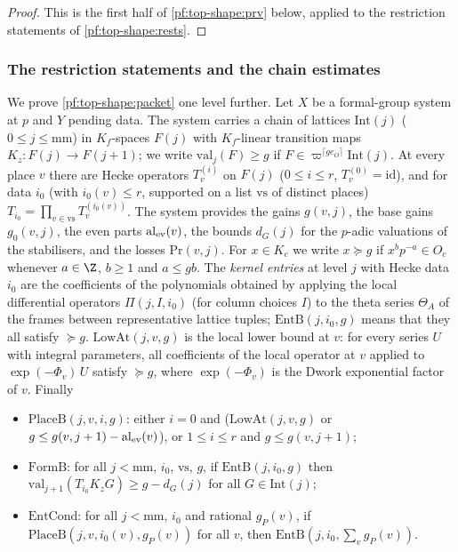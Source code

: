 \begin{proof}
This is the first half of \cref{pf:top-shape:prv} below, applied to the restriction statements of
\cref{pf:top-shape:rests}.
\end{proof}

\subsubsection*{The restriction statements and the chain estimates}

We prove \cref{pf:top-shape:packet} one level further. Let $X$ be a formal-group system at $p$ and $Y$ pending data.
The system carries a chain of lattices $\mathrm{Int}(j)$ ($0\le j\le\mathrm{mm}$) in $K_f$-spaces $F(j)$ with $K_f$-linear
transition maps $K_z\colon F(j)\to F(j+1)$; we write $\mathrm{val}_j(F)\ge g$ if $F\in\varpi^{\lceil ge_O\rceil}\mathrm{Int}(j)$.
At every place $v$ there are Hecke operators $T^{(i)}_v$ on $F(j)$ ($0\le i\le r$, $T^{(0)}_v=\mathrm{id}$), and for data
$i_0$ (with $i_0(v)\le r$, supported on a list $\mathrm{vs}$ of distinct places) $T_{i_0}=\prod_{v\in\mathrm{vs}}T_v^{(i_0(v))}$.
The system provides the gains $g(v,j)$, the base gains $g_0(v,j)$, the even parts $\mathrm{al}_{\rm ev}(v)$, the bounds
$d_G(j)$ for the $p$-adic valuations of the stabilisers, and the losses $\mathrm{Pr}(v,j)$. For $x\in K_c$ we write
$x\succeq g$ if $x^bp^{-a}\in O_c$ whenever $a\in\Z$, $b\ge1$ and $a\le gb$. The \emph{kernel entries} at level $j$ with
Hecke data $i_0$ are the coefficients of the polynomials obtained by applying the local differential operators
$\Pi(j,I,i_0)$ (for column choices $I$) to the theta series $\Theta_A$ of the frames between representative lattice tuples;
$\mathrm{EntB}(j,i_0,g)$ means that they all satisfy $\succeq g$. $\mathrm{LowAt}(j,v,g)$ is the local lower bound at $v$:
for every series $U$ with integral parameters, all coefficients of the local operator at $v$ applied to
$\exp(-\Phi_v)\,U$ satisfy $\succeq g$, where $\exp(-\Phi_v)$ is the Dwork exponential factor of $v$. Finally
\begin{itemize}
\item $\mathrm{PlaceB}(j,v,i,g)$: either $i=0$ and ($\mathrm{LowAt}(j,v,g)$ or $g\le g(v,j+1)-\mathrm{al}_{\rm ev}(v)$), or $1\le i\le r$
and $g\le g(v,j+1)$;
\item $\mathrm{FormB}$: for all $j<\mathrm{mm}$, $i_0$, $\mathrm{vs}$, $g$, if $\mathrm{EntB}(j,i_0,g)$ then
$\mathrm{val}_{j+1}(T_{i_0}K_zG)\ge g-d_G(j)$ for all $G\in\mathrm{Int}(j)$;
\item $\mathrm{EntCond}$: for all $j<\mathrm{mm}$, $i_0$ and rational $g_P(v)$, if $\mathrm{PlaceB}(j,v,i_0(v),g_P(v))$ for all $v$, then
$\mathrm{EntB}(j,i_0,\sum_vg_P(v))$.
\end{itemize}

